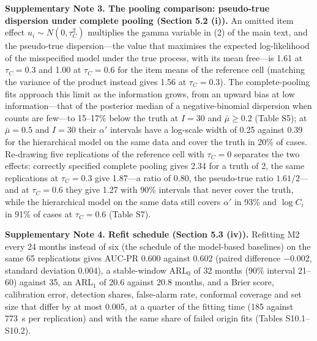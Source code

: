 \textbf{Supplementary Note 3. The pooling comparison: pseudo-true dispersion under complete pooling (Section 5.2 (i)).}
An omitted item effect $u_i \sim N(0, \tau_C^2)$ multiplies the gamma variable in (2) of the main text, and the pseudo-true dispersion---the value that maximises the expected log-likelihood of the misspecified model under the true process, with its mean free---is 1.61 at $\tau_C = 0.3$ and 1.00 at $\tau_C = 0.6$ for the item means of the reference cell (matching the variance of the product instead gives 1.56 at $\tau_C = 0.3$). The complete-pooling fits approach this limit as the information grows, from an upward bias at low information---that of the posterior median of a negative-binomial dispersion when counts are few---to 15--17\% below the truth at $I = 30$ and $\bar{\mu} \ge 0.2$ (Table S5); at $\bar{\mu} = 0.5$ and $I = 30$ their $\alpha'$ intervals have a log-scale width of 0.25 against 0.39 for the hierarchical model on the same data and cover the truth in 20\% of cases. Re-drawing five replications of the reference cell with $\tau_C = 0$ separates the two effects: correctly specified complete pooling gives 2.34 for a truth of 2, the same replications at $\tau_C = 0.3$ give 1.87---a ratio of 0.80, the pseudo-true ratio $1.61/2$---and at $\tau_C = 0.6$ they give 1.27 with 90\% intervals that never cover the truth, while the hierarchical model on the same data still covers $\alpha'$ in 93\% and $\log C_i$ in 91\% of cases at $\tau_C = 0.6$ (Table S7).

\textbf{Supplementary Note 4. Refit schedule (Section 5.3 (iv)).}
Refitting M2 every 24 months instead of six (the schedule of the model-based baselines) on the same 65 replications gives AUC-PR 0.600 against 0.602 (paired difference $-0.002$, standard deviation 0.004), a stable-window ARL$_0$ of 32 months (90\% interval 21--60) against 35, an ARL$_1$ of 20.6 against 20.8 months, and a Brier score, calibration error, detection shares, false-alarm rate, conformal coverage and set size that differ by at most 0.005, at a quarter of the fitting time (185 against 773~s per replication) and with the same share of failed origin fits (Tables S10.1--S10.2).

